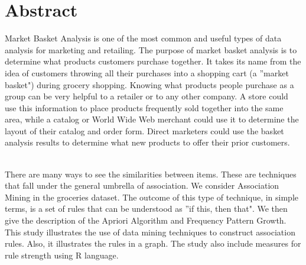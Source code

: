 \documentclass{article}\usepackage[]{graphicx}\usepackage[]{color}
\begin{document}





\section{Abstract}
\hspace{0.9cm} Market Basket Analysis is one of the most common and useful types of data analysis for marketing and retailing.  The purpose of market basket analysis is to determine what products customers purchase together.  It takes its name from the idea of customers throwing all their purchases into a shopping cart (a ''market basket") during grocery shopping.  Knowing what products people purchase as a group can be very helpful to a retailer or to any other company.  A store could use this information to place products frequently sold together into the same area, while a catalog or World Wide Web merchant could use it to determine the layout of their catalog and order form.  Direct marketers could use the basket analysis results to determine what new products to offer their prior customers.\par\\
\hspace{0.5cm}There are many ways to see the similarities between items. These are techniques that fall under the general umbrella of association. We consider Association Mining in the groceries dataset. The outcome of this type of technique, in simple terms, is a set of rules that can be understood as ''if this, then that". We then give the description of the Apriori Algorithm  and Frequency Pattern Growth. This study illustrates the use of data mining techniques to construct association rules. Also, it illustrates the rules in a graph. The study also include measures for rule strength using R language.

\end{document}
